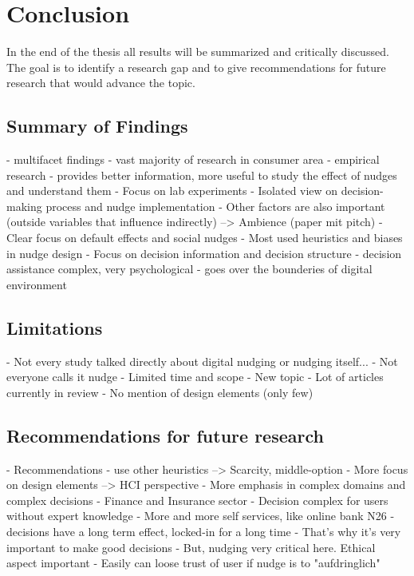 \section{Conclusion}
In the end of the thesis all results will be summarized and critically discussed. The goal is to identify a research gap and to give recommendations for future research that would advance the topic.


 \subsection{Summary of Findings}
 - multifacet findings
- vast majority of research in consumer area
- empirical research
- provides better information, more useful to study the effect of nudges and understand them
- Focus on lab experiments
- Isolated view on decision-making process and nudge implementation
- Other factors are also important (outside variables that influence indirectly) --> Ambience (paper mit pitch)
- Clear focus on default effects and social nudges
- Most used heuristics and biases in nudge design
- Focus on decision information and decision structure
- decision assistance complex, very psychological
- goes over the bounderies of digital environment
 
 \subsection{Limitations}
 - Not every study talked directly about digital nudging or nudging itself...
 - Not everyone calls it nudge
 - Limited time and scope
 - New topic
 - Lot of articles currently in review
 - No mention of design elements (only few)
 
 \subsection{Recommendations for future research}
 

- Recommendations
- use other heuristics --> Scarcity, middle-option
- More focus on design elements --> HCI perspective
- More emphasis in complex domains and complex decisions
- Finance and Insurance sector
- Decision complex for users without expert knowledge
- More and more self services, like online bank N26
- decisions have a long term effect, locked-in for a long time
- That's why it's very important to make good decisions
- But, nudging very critical here. Ethical aspect important
- Easily can loose trust of user if nudge is to "aufdringlich"